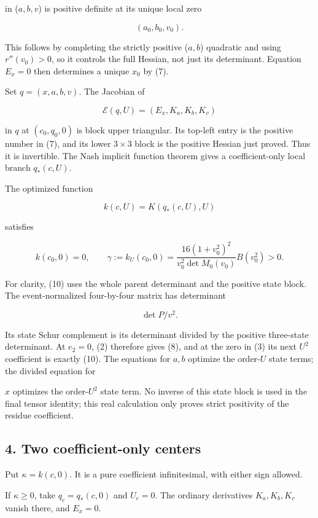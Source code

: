 in (\(a,b,v\)) is positive definite at its unique local zero

\[
(a_0,b_0,v_0).
\]

This follows by completing the strictly positive (\(a,b\)) quadratic and
using \(r''(v_0)>0\), so it controls the full Hessian, not just its
determinant. Equation \(E_x=0\) then determines a unique \(x_0\) by (7).

Set \(q=(x,a,b,v)\). The Jacobian of

\[
\mathcal E(q,U)=(E_x,K_a,K_b,K_v)
\tag{9}
\]

in \(q\) at \((c_0,q_0,0)\) is block upper triangular. Its top-left entry is
the positive number in (7), and its lower \(3\times3\) block is the positive
Hessian just proved. Thus it is invertible. The Nash implicit function
theorem gives a coefficient-only local branch \(q_*(c,U)\).

The optimized function

\[
k(c,U)=K(q_*(c,U),U)
\]

satisfies

\[
k(c_0,0)=0,\qquad
\gamma:=k_U(c_0,0)
=\frac{16(1+v_0^2)^2}{v_0^2\det M_0(v_0)}B(v_0^2)>0.
\tag{10}
\]

For clarity, (10) uses the whole parent determinant and the positive state
block. The event-normalized four-by-four matrix has determinant

\[
\det P/v^2.
\]

Its state Schur complement is its determinant divided by the positive
three-state determinant. At \(e_2=0\), (2) therefore gives (8), and at the
zero in (3) its next \(U^2\) coefficient is exactly (10). The equations
for \(a,b\) optimize the order-\(U\) state terms; the divided equation for

\(x\) optimizes the order-\(U^2\) state term. No inverse of this state block
is used in the final tensor identity; this real calculation only proves
strict positivity of the residue coefficient.

\hypertarget{two-coefficient-only-centers}{%
\subsection{4. Two coefficient-only centers}\label{p4ec1a51262f9:two-coefficient-only-centers}}

Put \(\kappa=k(c,0)\). It is a pure coefficient infinitesimal, with either
sign allowed.

If \(\kappa\ge0\), take \(q_c=q_*(c,0)\) and \(U_c=0\). The ordinary
derivatives \(K_a,K_b,K_v\) vanish there, and \(E_x=0\).

